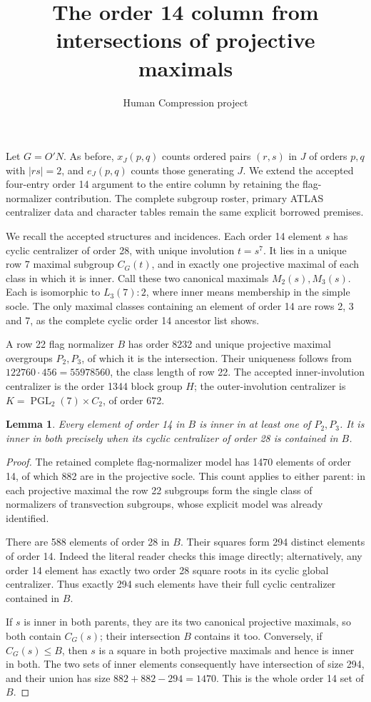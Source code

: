 \documentclass[11pt,a4paper]{article}
\title{The order 14 column from intersections of projective maximals}
\author{Human Compression project}\date{}
\newtheorem{lemma}{Lemma}\newtheorem{theorem}{Theorem}
\begin{document}
\maketitle
Let $G=O'N$. As before, $x_J(p,q)$ counts ordered pairs $(r,s)$
in $J$ of orders $p,q$ with $|rs|=2$, and $e_J(p,q)$ counts those
generating $J$. We extend the accepted four-entry order 14 argument
to the entire column by retaining the flag-normalizer contribution.
The complete subgroup roster, primary ATLAS centralizer data and
character tables remain the same explicit borrowed premises.

We recall the accepted structures and incidences. Each order 14
element $s$ has cyclic centralizer of order 28, with unique involution
$t=s^7$. It lies in a unique row 7 maximal subgroup $C_G(t)$,
and in exactly one projective maximal of each class in which it
is inner. Call these two canonical maximals $M_2(s),M_3(s)$.
Each is isomorphic to $L_3(7):2$, where inner means membership
in the simple socle. The only maximal classes containing an
element of order 14 are rows 2, 3 and 7, as the complete cyclic
order 14 ancestor list shows.

A row 22 flag normalizer $B$ has order 8232 and unique projective
maximal overgroups $P_2,P_3$, of which it is the intersection.
Their uniqueness follows from
$122760\cdot456=55978560$, the class length of row 22.
The accepted inner-involution centralizer is the order 1344
block group $H$; the outer-involution centralizer is
$K=\operatorname{PGL}_2(7)\times C_2$, of order 672.

\begin{lemma}\label{cover}
Every element of order 14 in $B$ is inner in at least one of
$P_2,P_3$. It is inner in both precisely when its cyclic
centralizer of order 28 is contained in $B$.
\end{lemma}
\begin{proof}
The retained complete flag-normalizer model has 1470 elements of
order 14, of which 882 are in the projective socle. This count
applies to either parent: in each projective maximal the row 22
subgroups form the single class of normalizers of transvection
subgroups, whose explicit model was already identified.

There are 588 elements of order 28 in $B$. Their squares form
294 distinct elements of order 14. Indeed the literal reader
checks this image directly; alternatively, any order 14 element
has exactly two order 28 square roots in its cyclic global
centralizer. Thus exactly 294 such elements have their full
cyclic centralizer contained in $B$.

If $s$ is inner in both parents, they are its two canonical
projective maximals, so both contain $C_G(s)$; their intersection
$B$ contains it too. Conversely, if $C_G(s)\leq B$, then $s$ is
a square in both projective maximals and hence is inner in both.
The two sets of inner elements consequently have intersection
of size 294, and their union has size
$882+882-294=1470$. This is the whole order 14 set of $B$.
\end{proof}
\end{document}

